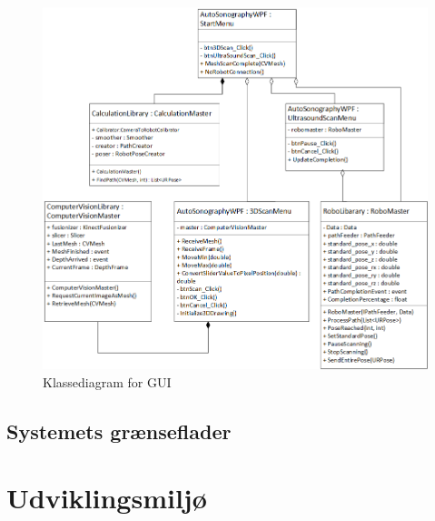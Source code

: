 \begin{figure}[H]
    \centering
    \includegraphics[width=1\textwidth]{figurer/d/Design/Class/uml_class_gui}
    \caption{Klassediagram for GUI}
    \label{class_gui}
\end{figure}

\subsection{Systemets grænseflader}


\section{Udviklingsmiljø} 



